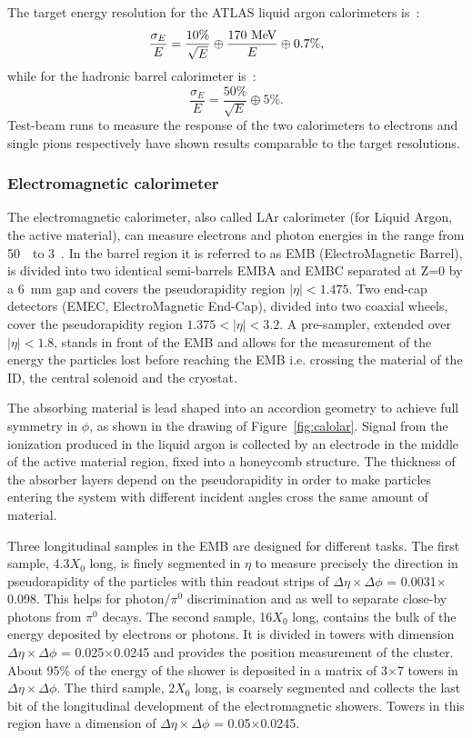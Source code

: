 The target energy resolution for the ATLAS liquid argon calorimeters is~\cite{lar_readiness}:
\begin{equation}
\frac{\sigma_{E}}{E}=\frac{10\%}{\sqrt{E}} \oplus\frac{170\MeV}{E} \oplus 0.7\%,
\end{equation}
while for the hadronic barrel calorimeter is~\cite{tile_readiness}:
\begin{equation}
\frac{\sigma_{E}}{E}=\frac{50\%}{\sqrt{E}} \oplus 5\%.
\end{equation}
Test-beam runs to measure the response of the two calorimeters to electrons
and single pions respectively have shown results comparable to the target resolutions.


\subsubsection{Electromagnetic calorimeter}\label{sec:emcalbarrel}

The electromagnetic calorimeter, also called LAr calorimeter 
(for Liquid Argon, the active material),
can measure electrons and photon energies in the range from 50~\mev\ to 3~\tev.
In the barrel region it is referred to as EMB (ElectroMagnetic Barrel), is 
divided into two identical semi-barrels EMBA and EMBC separated at Z=0 by a 6~mm
gap and covers the pseudorapidity region $|\eta|<1.475$. 
Two end-cap detectors (EMEC, ElectroMagnetic End-Cap), divided 
into two coaxial wheels, cover the pseudorapidity 
region $1.375<|\eta|<3.2$. A pre-sampler, extended over 
$|\eta|<1.8$, stands in front of the EMB and allows for the measurement of
the energy the particles lost before reaching the EMB i.e. crossing the
material of the ID, the central solenoid and the cryostat.

The absorbing material is lead shaped into an accordion geometry to achieve
full symmetry in $\phi$, as shown in the drawing of Figure~\ref{fig:calolar}.
Signal from the ionization produced in the liquid argon is collected
by an electrode in the middle of the active material region, fixed into
a honeycomb structure.
The thickness of the absorber layers depend on the pseudorapidity in
order to make particles entering the system with different incident 
angles cross the same amount of material.

Three longitudinal samples in the EMB are designed for different tasks. The first
sample, 4.3$X_0$ long, is finely segmented in $\eta$ to measure precisely
the direction in pseudorapidity of the particles with  thin readout strips
of $\Delta\eta\times\Delta\phi$ = 0.0031$\times$0.098. This helps for
photon/$\pi^{0}$ discrimination and as well to separate close-by photons
from $\pi^{0}$ decays.
The second sample, 16$X_0$ long, contains the bulk of 
the energy deposited by electrons or photons.
It is divided in towers with dimension $\Delta\eta\times\Delta\phi$ = 0.025$\times$0.0245
and provides the position measurement of the cluster. 
About  95\% of the energy of the shower is deposited in a matrix of 3$\times$7 
towers in $\Delta\eta\times\Delta\phi$.
The third sample, 2$X_0$ long, is coarsely segmented 
and collects the last bit of the longitudinal
development of the electromagnetic showers. Towers in this region have a dimension
of $\Delta\eta\times\Delta\phi$ = 0.05$\times$0.0245.

